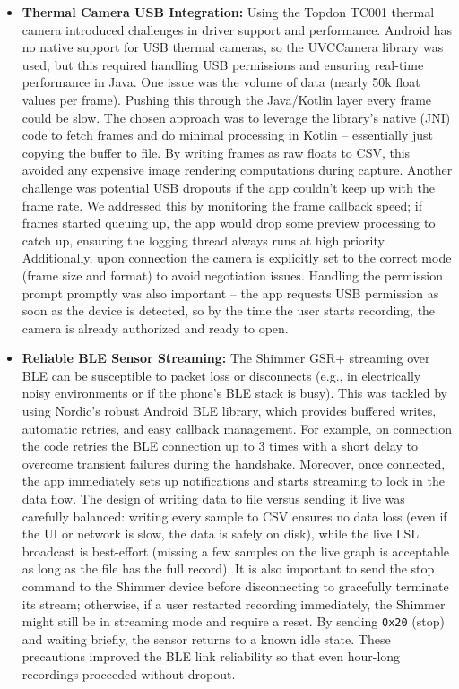 \begin{itemize}
  \item \textbf{Thermal Camera USB Integration:} Using the Topdon TC001 thermal camera introduced challenges in driver support and performance. Android has no native support for USB thermal cameras, so the UVCCamera library was used, but this required handling USB permissions and ensuring real-time performance in Java. One issue was the volume of data (nearly 50k float values per frame). Pushing this through the Java/Kotlin layer every frame could be slow. The chosen approach was to leverage the library's native (JNI) code to fetch frames and do minimal processing in Kotlin -- essentially just copying the buffer to file. By writing frames as raw floats to CSV, this avoided any expensive image rendering computations during capture. Another challenge was potential USB dropouts if the app couldn't keep up with the frame rate. We addressed this by monitoring the frame callback speed; if frames started queuing up, the app would drop some preview processing to catch up, ensuring the logging thread always runs at high priority. Additionally, upon connection the camera is explicitly set to the correct mode (frame size and format) to avoid negotiation issues. Handling the permission prompt promptly was also important -- the app requests USB permission as soon as the device is detected, so by the time the user starts recording, the camera is already authorized and ready to open.
  \item \textbf{Reliable BLE Sensor Streaming:} The Shimmer GSR+ streaming over BLE can be susceptible to packet loss or disconnects (e.g., in electrically noisy environments or if the phone's BLE stack is busy). This was tackled by using Nordic's robust Android BLE library, which provides buffered writes, automatic retries, and easy callback management. For example, on connection the code retries the BLE connection up to 3 times with a short delay to overcome transient failures during the handshake. Moreover, once connected, the app immediately sets up notifications and starts streaming to lock in the data flow. The design of writing data to file versus sending it live was carefully balanced: writing every sample to CSV ensures no data loss (even if the UI or network is slow, the data is safely on disk), while the live LSL broadcast is best-effort (missing a few samples on the live graph is acceptable as long as the file has the full record). It is also important to send the stop command to the Shimmer device before disconnecting to gracefully terminate its stream; otherwise, if a user restarted recording immediately, the Shimmer might still be in streaming mode and require a reset. By sending \texttt{0x20} (stop) and waiting briefly, the sensor returns to a known idle state. These precautions improved the BLE link reliability so that even hour-long recordings proceeded without dropout.

\end{itemize}

